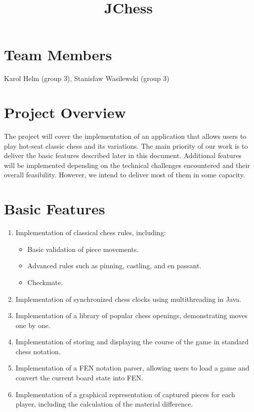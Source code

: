 \documentclass[12pt,a4paper]{article}
\title{\textbf{JChess}}
\date{}
\begin{document}
\maketitle
\section{Team Members}
Karol Helm (group 3), Stanisław Wasilewski (group 3)

\section{Project Overview}
The project will cover the implementation of an application that allows users to play hot-seat classic chess and its variations. The main priority of our work is to deliver the basic features described later in this document. Additional features will be implemented depending on the technical challenges encountered and their overall feasibility. However, we intend to deliver most of them in some capacity.

\section{Basic Features}
\begin{enumerate}
    \item Implementation of classical chess rules, including:
    \begin{itemize}
        \item Basic validation of piece movements.
        \item Advanced rules such as pinning, castling, and en passant.
        \item Checkmate.
    \end{itemize}
    \item Implementation of synchronized chess clocks using multithreading in Java.
    \item Implementation of a library of popular chess openings, demonstrating moves one by one.
    \item Implementation of storing and displaying the course of the game in standard chess notation.
    \item Implementation of a FEN notation parser, allowing users to load a game and convert the current board state into FEN.
    \item Implementation of a graphical representation of captured pieces for each player, including the calculation of the material difference.
\end{enumerate}
\end{document}
